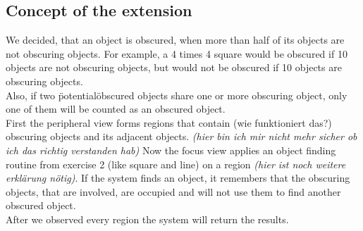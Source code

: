 \documentclass[11pt,a4paper,oneside]{scrartcl}
\begin{document}
\subsection{Concept of the extension}
We decided, that an object is obscured, when more than half of its objects are not obscuring objects. For example, a 4 times 4 square would be obscured if 10 objects are not obscuring objects, but would not be obscured if 10 objects are obscuring objects.\\
Also, if two \"potential\" obscured objects share one or more obscuring object, only one of them will be counted as an obscured object.\\
First the peripheral view forms regions that contain (wie funktioniert das?) obscuring objects and its adjacent objects. \textit{(hier bin ich mir nicht mehr sicher ob ich das richtig verstanden hab)} Now the focus view applies an object finding routine from exercise 2 (like square and line) on a region \textit{(hier ist noch weitere erklärung nötig)}. If the system finds an object, it remembers that the obscuring objects, that are involved, are occupied and will not use them to find another obscured object.\\
After we observed every region the system will return the results.
\end{document}
